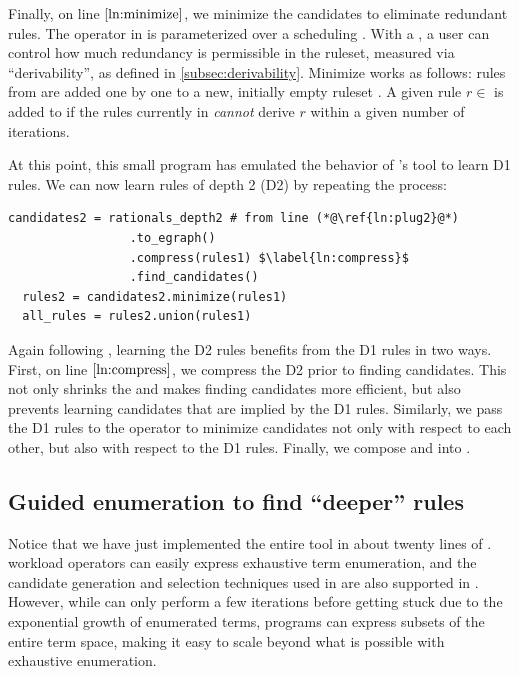 Finally, on line $\ref{ln:minimize}$,
 we minimize the candidates
 to eliminate redundant rules.
The  operator in \enumo
 is parameterized over a scheduling .
With a , a user can control
 how much redundancy is permissible in the ruleset,
 measured via ``derivability'', as defined
 in \autoref{subsec:derivability}.
Minimize works as follows:
rules from  are added one by one
to a new, initially empty ruleset . A given rule $r \in$ 
is added to  if the rules currently in  \textit{cannot}
derive $r$ within a given number of \eqsat iterations.

At this point,
 this small \enumo program has emulated the
 behavior of \citet{ruler}'s  tool
 to learn D1 rules.
We can now learn rules of depth 2 (D2)
 by repeating the process:
\pagebreak

\begin{lstlisting}[name=overview]
  candidates2 = rationals_depth2 # from line (*@\ref{ln:plug2}@*)
                 .to_egraph()
                 .compress(rules1) $\label{ln:compress}$
                 .find_candidates()
  rules2 = candidates2.minimize(rules1)
  all_rules = rules2.union(rules1)
\end{lstlisting}

Again following \citet{ruler},
 learning the D2 rules benefits from the D1 rules
 in two ways.
First,
 on line $\ref{ln:compress}$,
 we
 compress the D2 \egraph
 prior to finding candidates.
This not only shrinks the \egraph
 and makes finding candidates more efficient,
 but also prevents learning candidates that are implied by the D1 rules.
Similarly,
 we pass the D1 rules to the  operator
 to minimize candidates not only with respect to each other,
 but also with respect to the D1 rules.
 Finally,
 we compose  and  into .

\subsection{Guided enumeration to find ``deeper'' rules}
\label{sec:guided-enumeration}

Notice that we have just implemented the entire  tool in about twenty
  lines of \enumo.
\enumo workload operators can easily express exhaustive term enumeration, and
  the candidate generation and selection techniques used in  are also
  supported in \enumo.
However, while  can only perform a few iterations before getting stuck
  due to the exponential growth of enumerated terms, \enumo programs can
  express subsets of the entire term space, making it easy to scale beyond what
  is possible with exhaustive enumeration.

